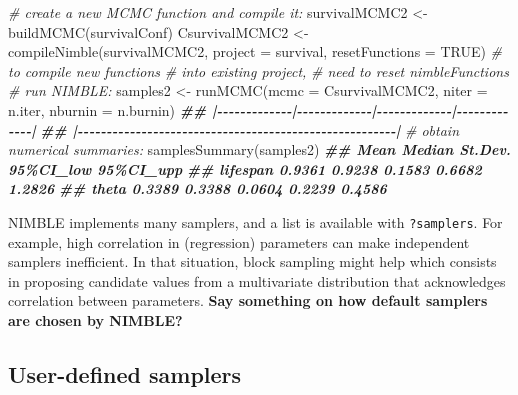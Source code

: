 \documentclass[
  12pt,
]{krantz}
\newenvironment{Shaded}{\begin{snugshade}}{\end{snugshade}}
\newcommand{\AttributeTok}[1]{\textcolor[rgb]{0.77,0.63,0.00}{#1}}
\newcommand{\CommentTok}[1]{\textcolor[rgb]{0.56,0.35,0.01}{\textit{#1}}}
\newcommand{\ConstantTok}[1]{\textcolor[rgb]{0.00,0.00,0.00}{#1}}
\newcommand{\DocumentationTok}[1]{\textcolor[rgb]{0.56,0.35,0.01}{\textbf{\textit{#1}}}}
\newcommand{\FunctionTok}[1]{\textcolor[rgb]{0.00,0.00,0.00}{#1}}
\newcommand{\NormalTok}[1]{#1}
\newcommand{\OtherTok}[1]{\textcolor[rgb]{0.56,0.35,0.01}{#1}}
\begin{document}
\begin{Shaded}
\begin{Highlighting}[]
\CommentTok{\# create a new MCMC function and compile it:}
\NormalTok{survivalMCMC2 }\OtherTok{\textless{}{-}} \FunctionTok{buildMCMC}\NormalTok{(survivalConf)}
\NormalTok{CsurvivalMCMC2 }\OtherTok{\textless{}{-}} \FunctionTok{compileNimble}\NormalTok{(survivalMCMC2, }
                                \AttributeTok{project =}\NormalTok{ survival,}
                                \AttributeTok{resetFunctions =} \ConstantTok{TRUE}\NormalTok{) }\CommentTok{\# to compile new functions }
                                                       \CommentTok{\# into existing project, }
                                                       \CommentTok{\# need to reset nimbleFunctions}
\CommentTok{\# run NIMBLE:}
\NormalTok{samples2 }\OtherTok{\textless{}{-}} \FunctionTok{runMCMC}\NormalTok{(}\AttributeTok{mcmc =}\NormalTok{ CsurvivalMCMC2, }
                    \AttributeTok{niter =}\NormalTok{ n.iter,}
                    \AttributeTok{nburnin =}\NormalTok{ n.burnin)}
\DocumentationTok{\#\# |{-}{-}{-}{-}{-}{-}{-}{-}{-}{-}{-}{-}{-}|{-}{-}{-}{-}{-}{-}{-}{-}{-}{-}{-}{-}{-}|{-}{-}{-}{-}{-}{-}{-}{-}{-}{-}{-}{-}{-}|{-}{-}{-}{-}{-}{-}{-}{-}{-}{-}{-}{-}{-}|}
\DocumentationTok{\#\# |{-}{-}{-}{-}{-}{-}{-}{-}{-}{-}{-}{-}{-}{-}{-}{-}{-}{-}{-}{-}{-}{-}{-}{-}{-}{-}{-}{-}{-}{-}{-}{-}{-}{-}{-}{-}{-}{-}{-}{-}{-}{-}{-}{-}{-}{-}{-}{-}{-}{-}{-}{-}{-}{-}{-}|}
\CommentTok{\# obtain numerical summaries:}
\FunctionTok{samplesSummary}\NormalTok{(samples2)}
\DocumentationTok{\#\#            Mean Median St.Dev. 95\%CI\_low 95\%CI\_upp}
\DocumentationTok{\#\# lifespan 0.9361 0.9238  0.1583    0.6682    1.2826}
\DocumentationTok{\#\# theta    0.3389 0.3388  0.0604    0.2239    0.4586}
\end{Highlighting}
\end{Shaded}

NIMBLE implements many samplers, and a list is available with \texttt{?samplers}. For example, high correlation in (regression) parameters can make independent samplers inefficient. In that situation, block sampling might help which consists in proposing candidate values from a multivariate distribution that acknowledges correlation between parameters. \textbf{Say something on how default samplers are chosen by NIMBLE?}

\hypertarget{user-defined-samplers}{%
\subsection{User-defined samplers}\label{user-defined-samplers}}
\end{document}
